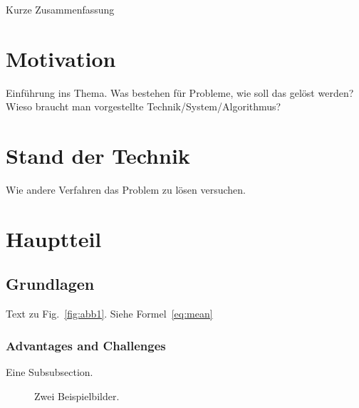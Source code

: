 \documentclass{llncs}
\begin{document}
Kurze Zusammenfassung

 






\newpage

\section{Motivation}
\label{sec:Motivation}
Einführung ins Thema. Was bestehen für Probleme, wie soll das gelöst werden? \\

Wieso braucht man vorgestellte Technik/System/Algorithmus?



\section{Stand der Technik} \label{sec:sdt}
%
Wie andere Verfahren das Problem zu lösen versuchen. \cite{OCBible}

\section{Hauptteil}
\label{sec:Hauptteil}

\subsection{Grundlagen}
\label{sec:Grundlagen}
Text zu Fig.~\ref{fig:abb1}. Siehe Formel~\ref{eq:mean}

\subsubsection{Advantages and Challenges}
Eine Subsubsection.


\begin{figure}
	\centering
	\hfill
	\caption{Zwei Beispielbilder.}
\end{figure}
\end{document}
